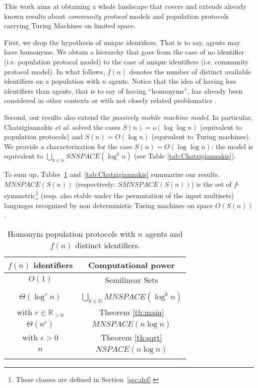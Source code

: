 \documentclass[UKenglish]{llncs}
\newcommand\N{\mathbb{N}}
\begin{document}
This work aims at obtaining a whole landscape that covers and extends
already known results about \emph{community protocol} models and
population protocols carrying Turing Machines on limited space.
  
First,   
we drop the hypothesis of unique identifiers. That is to say,  agents may have homonyms. We obtain a hierarchy that goes from the case of no
  identifier (i.e. population protocol
  model) to the case of unique identifiers (i.e. community protocol
  model). In what follows, $f(n)$ denotes the number of distinct available
  identifiers on a population with $n$ agents.  Notice that the idea
  of having less identifiers than agents, that is to say of having ``homonyms'',  has already been considered
  in other contexts or with not closely related problematics 
  \cite{Delporte-Gallet:2011,Delporte-Gallet:2012,ArevaloAIJR12,Guiseppe2013}. 


Second, our results also extend the \emph{passively mobile
machine model}. In particular,
Chatzigiannakis \emph{et
  al.}  \cite{chatzigiannakis2011passively}  solved the cases
$S(n)=o(\log \log n)$ (equivalent to population protocols) and
$S(n)=O(\log n)$ (equivalent to Turing machines).
We provide a characterization for the case $S(n)=O(\log \log n)$:
the model is equivalent to
  $\bigcup_{k \in \N}SNSPACE(\log^k n)$ (see Table \ref{tab:Chatzigiannakis}).






To sum up, Tables~\ref{tab:Guerraoui}
and~\ref{tab:Chatzigiannakis} summarize  our results. 
$MNSPACE(S(n))$ (respectively:  $SMNSPACE(S(n))$) is the set of
$f$-symmetric\footnote{These classes are defined in Section~\ref{sec:def}.} (resp. also stable under
the permutation of the input multisets) 
languages recognized by non deterministic Turing
machines on space $O(S(n))$. 
   \begin{table}
\vspace{-0.3cm}
\begin{center}
\begin{tabular}{c|c}
$f(n)$ identifiers   &  Computational power\\\hline
$O(1)$ & Semilinear Sets \\
& \cite{angluin2007cpp,AspnesADFP2004} \\  \hline
$\Theta(\log^r n)$ &
$\bigcup_{k \in \mathbb{N}} MNSPACE\left(\log^k n\right)$ \\
with $r\in\mathbb{R}_{>0}$&   Theorem \ref{th:main} \\ 
\hline
$\Theta(n^\epsilon)$&  $MNSPACE(n\log n)$ \\
with $\epsilon>0$& Theorem \ref{th:sqrt} \\
\hline 
$n$ &  $NSPACE(n\log n)$\\
& \cite{guerraoui2009names} \\\end{tabular}
\end{center}
\caption{Homonym population
protocols with $n$ agents and $f(n)$ distinct identifiers.}
\label{tab:Guerraoui}

    \end{table}
\end{document}
